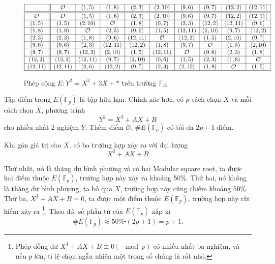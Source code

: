 \begin{figure}[H]
	\label{fg:tb1}
	\caption{Phép cộng $E: Y^2 = X^3 + 3X + *$ trên trường $\mathbb{F}_{13}$}
	$
		\begin{array}{|c||c|c|c|c|c|c|c|c|c|}
			\hline
			            & \mathcal{O} & (1,5)       & (1,8)       & (2,3)   & (2,10)      & (9,6)       & (9,7)       & (12,2)      & (12,11)     \\
			\hline
			\hline
			\mathcal{O} & \mathcal{O} & (1,5)       & (1,8)       & (2,3)   & (2,10)      & (9,6)       & (9,7)       & (12,2)      & (12,11)     \\
			\hline
			(1,5)       & (1,5)       & (2,10)      & \mathcal{O} & (1,8)   & (9,7)       & (2,3)       & (12,2)      & (12,11)     & (9,6)       \\
			\hline
			(1,8)       & (1,8)       & \mathcal{O} & (2,3)       & (9,6)   & (1,5)       & (12,11)     & (2,10)      & (9,7)       & (12,2)      \\
			\hline
			(2,3)       & (2,3)       & (1,8)       & (9,6)       & (12,11) & \mathcal{O} & (12,2)      & (1,5)       & (2,10)      & (9,7)       \\
			\hline
			(9,6)       & (9,6)       & (2,3)       & (12,11)     & (12,2)  & (1,8)       & (9,7)       & \mathcal{O} & (1,5)       & (2,10)      \\
			\hline
			(9,7)       & (9,7)       & (12,2)      & (2,10)      & (1,5)   & (12,11)     & \mathcal{O} & (9,6)       & (2,3)       & (1,8)       \\
			\hline
			(12,2)      & (12,2)      & (12,11)     & (9,7)       & (2,10)  & (9,6)       & (1,5)       & (2,3)       & (1,8)       & \mathcal{O} \\
			\hline
			(12,11)     & (12,11)     & (9,6)       & (12,2)      & (9,7)   & (2,3)       & (2,10)      & (1,8)       & \mathcal{O} & (1,5)       \\
			\hline
		\end{array}
	$
\end{figure}


Tập điểm trong $E(\mathbb{F}_{p})$ là tập hữu hạn. Chính xác hơn, có  $p$ cách chọn $X$ và mỗi cách chọn $X$, phương trình
$$Y^2 = X^3 + AX + B$$
cho nhiều nhất 2 nghiệm $Y$. Thêm điểm $\mathcal{O}$, $\#E(\mathbb{F}_{p})$ có tối đa $2p+1$ điểm.

Khi gán giá trị cho $X$, có ba trường hợp xảy ra với đại lượng
$$X^3 + AX + B$$

Thứ nhất, nó là thặng dư bình phương và có hai Modular square root, ta được hai điểm thuộc $E(\mathbb{F}_{p})$, trường hợp này xảy ra khoảng 50\%.
Thứ hai, nó không là thặng dư bình phương, ta bỏ qua $X$, trường hợp này cũng chiếm khoảng 50\%.
Thứ ba, $X^3 + AX + B = 0$, ta được một điểm thuộc $E(\mathbb{F}_{p})$, trường hợp này rất hiếm xảy ra \footnote{Phép đồng dư $X^3 + AX + B \equiv 0 (\mod p)$ có nhiều nhất ba nghiệm, và nếu $p$ lớn, tỉ lệ chọn ngẫu nhiên một trong số chúng là rất nhỏ.}.
Theo đó, số phần tử của $E(\mathbb{F}_{p})$ xấp xỉ
$$ \#E(\mathbb{F}_{p}) \approx 50\% \centerdot (2p + 1) = p + 1.$$

